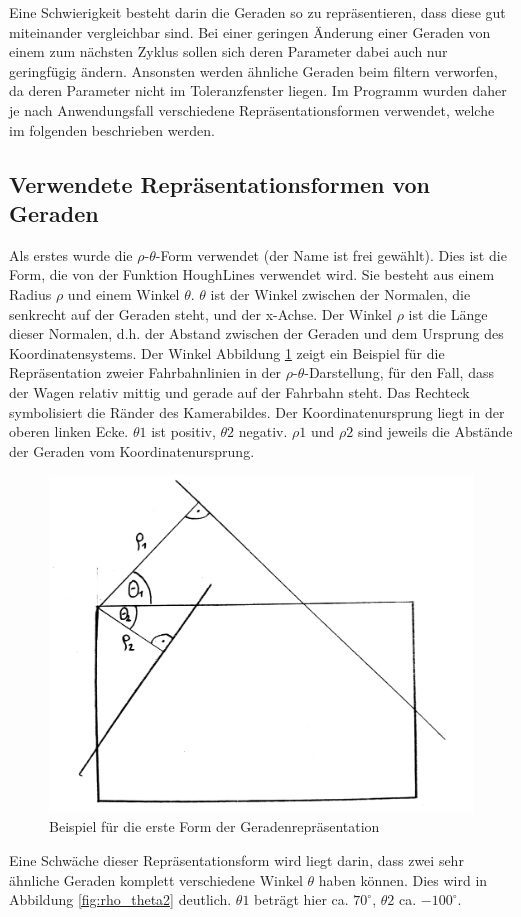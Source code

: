 	Eine Schwierigkeit besteht darin die Geraden so zu repräsentieren, dass diese gut miteinander vergleichbar sind. Bei einer geringen Änderung einer Geraden von einem zum nächsten Zyklus sollen sich deren Parameter dabei auch nur geringfügig ändern. Ansonsten werden ähnliche Geraden beim filtern verworfen, da deren Parameter nicht im Toleranzfenster liegen. Im Programm wurden daher je nach Anwendungsfall verschiedene Repräsentationsformen verwendet, welche im folgenden beschrieben werden.
	
	\subsection{Verwendete Repräsentationsformen von Geraden}
	
	Als erstes wurde die $\rho$-$\theta$-Form verwendet (der Name ist frei gewählt). Dies ist die Form, die von der Funktion HoughLines verwendet wird. Sie besteht aus einem Radius $\rho$ und einem Winkel $\theta$. $\theta$ ist der Winkel zwischen der Normalen, die senkrecht auf der Geraden steht, und der x-Achse. Der Winkel  $\rho$ ist die Länge dieser Normalen, d.h. der Abstand zwischen der Geraden und dem Ursprung des Koordinatensystems. Der Winkel 
	Abbildung \ref{fig:rho_theta1} zeigt ein Beispiel für die Repräsentation zweier Fahrbahnlinien in der $\rho$-$\theta$-Darstellung, für den Fall, dass der Wagen relativ mittig und gerade auf der Fahrbahn steht. Das Rechteck symbolisiert die Ränder des Kamerabildes. Der Koordinatenursprung liegt in der oberen linken Ecke. $\theta1$ ist positiv, $\theta2$ negativ. $\rho1$ und $\rho2$ sind jeweils die Abstände der Geraden vom Koordinatenursprung.
	
	\begin{figure}[H]
		\centering
		\includegraphics[width=.5\linewidth]{images/rho_theta1.jpg}
		\caption{Beispiel für die erste Form der Geradenrepräsentation}
		\label{fig:rho_theta1}
	\end{figure}
	
	Eine Schwäche dieser Repräsentationsform wird liegt darin, dass zwei sehr ähnliche Geraden komplett verschiedene Winkel $\theta$ haben können. Dies wird in Abbildung \ref{fig:rho_theta2} deutlich. $\theta1$ beträgt hier ca. $70^\circ$, $\theta2$ ca. $-100^\circ$.
	
